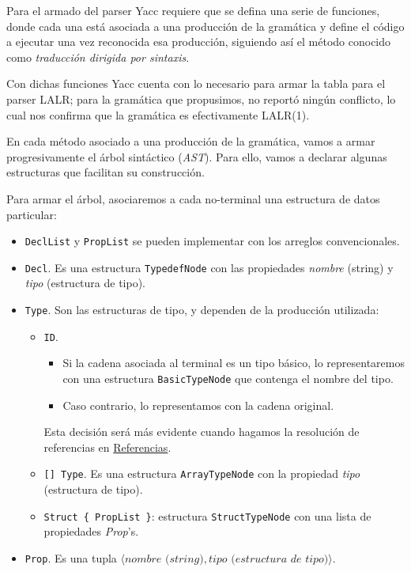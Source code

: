     Para el armado del parser Yacc requiere que se defina una serie de funciones, donde cada una está asociada a una producción de la gramática y define el código a ejecutar una vez reconocida esa producción, siguiendo así el método conocido como \textit{traducción dirigida por sintaxis}.
    
    Con dichas funciones Yacc cuenta con lo necesario para armar la tabla para el parser LALR; para la gramática que propusimos, no reportó ningún conflicto, lo cual nos confirma que la gramática es efectivamente LALR(1).
    
    En cada método asociado a una producción de la gramática, vamos a armar progresivamente el árbol sintáctico (\textit{AST}). Para ello, vamos a declarar algunas estructuras que facilitan su construcción. 
    
    Para armar el árbol, asociaremos a cada no-terminal una estructura de datos particular:

\begin{itemize}
    \item \texttt{DeclList} y \texttt{PropList} se pueden implementar con los
        arreglos convencionales.
    \item \texttt{Decl}. Es una estructura \texttt{TypedefNode} con las propiedades
        \textit{nombre} (string) y \textit{tipo} (estructura de tipo).
    \item \texttt{Type}. Son las estructuras de tipo, y dependen de la
        producción utilizada:
    \begin{itemize}
        \item \texttt{ID}. 
        \begin{itemize}
            \item Si la cadena asociada al terminal es un tipo básico,
            lo representaremos con una estructura \texttt{BasicTypeNode} que
            contenga el nombre del tipo. 
            \item Caso contrario, lo representamos con la cadena original.
        \end{itemize} 
        Esta decisión será más evidente cuando hagamos la resolución de referencias en \hyperlink{sec:referencias}{Referencias}.
        \item \texttt{[] Type}. Es una estructura \texttt{ArrayTypeNode} con la
            propiedad \textit{tipo} (estructura de tipo).
        \item \texttt{Struct \{ PropList \}}: estructura
            \texttt{StructTypeNode} con una lista de propiedades \textit{Prop}'s.
    \end{itemize}
    \item \texttt{Prop}. Es una tupla $\langle \textit{nombre (string)}, \textit{tipo
        (estructura de tipo)}\rangle$.
\end{itemize}


